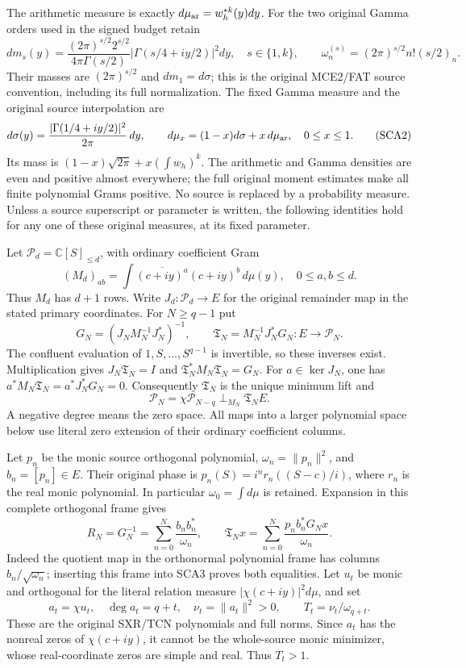 The arithmetic measure is exactly $d\mu_{\rm ar}=w_h^{*k}(y)dy$.
For the two original Gamma orders used in the signed budget retain
\[
 dm_s(y)=\frac{(2\pi)^{s/2}2^{s/2}}{4\pi\Gamma(s/2)}
           |\Gamma(s/4+iy/2)|^2dy,\quad s\in\{1,k\},\qquad
 \omega_n^{(s)}=(2\pi)^{s/2}n!(s/2)_n.
\]
Their masses are $(2\pi)^{s/2}$ and $dm_1=d\sigma$; this is the
original MCE2/FAT source convention, including its full normalization.
The fixed Gamma measure and the original source interpolation are
\[
 d\sigma(y)=\frac{|\Gamma(1/4+iy/2)|^2}{2\pi}\,dy,
 \qquad d\mu_x=(1-x)d\sigma+x\,d\mu_{\rm ar},\quad0\le x\le1.
 \tag{SCA2}
\]
Its mass is $(1-x)\sqrt{2\pi}+x(\int w_h)^k$.
The arithmetic and Gamma densities are even and positive almost everywhere;
the full original moment estimates make all finite polynomial Grams positive.
No source is replaced by a probability measure. Unless a source superscript
or parameter is written, the following identities hold for any one of
these original measures, at its fixed parameter.

Let $\mathcal P_d=\mathbb C[S]_{\le d}$, with ordinary coefficient Gram
\[
 (M_d)_{ab}=\int\overline{(c+iy)^a}(c+iy)^b\,d\mu(y),
 \quad0\le a,b\le d.
\]
Thus $M_d$ has $d+1$ rows. Write $J_d:\mathcal P_d\to E$ for the original
remainder map in the stated primary coordinates. For $N\ge q-1$ put
\[
 G_N=(J_NM_N^{-1}J_N^*)^{-1},\qquad
 \mathfrak T_N=M_N^{-1}J_N^*G_N:E\longrightarrow\mathcal P_N.
 \tag{SCA3}
\]
The confluent evaluation of $1,S,\ldots,S^{q-1}$ is invertible, so these
inverses exist. Multiplication gives $J_N\mathfrak T_N=I$ and
$\mathfrak T_N^*M_N\mathfrak T_N=G_N$. For
$a\in\ker J_N$, one has $a^*M_N\mathfrak T_N=a^*J_N^*G_N=0$.
Consequently $\mathfrak T_N$ is the unique minimum lift and
\[
 \mathcal P_N=\chi\mathcal P_{N-q}\mathbin{\perp_{M_N}}
                      \mathfrak T_NE.
 \tag{SCA4}
\]
A negative degree means the zero space. All maps into a larger polynomial
space below use literal zero extension of their ordinary coefficient columns.

Let $p_n$ be the monic source orthogonal polynomial, $\omega_n=\|p_n\|^2$,
and $b_n=[p_n]\in E$. Their original phase is
$p_n(S)=i^nr_n((S-c)/i)$, where $r_n$ is the real monic polynomial.
In particular $\omega_0=\int d\mu$ is retained. Expansion in this complete
orthogonal frame gives
\[
 R_N=G_N^{-1}=\sum_{n=0}^N\frac{b_nb_n^*}{\omega_n},\qquad
 \mathfrak T_Nx=\sum_{n=0}^N
               \frac{p_n b_n^*G_Nx}{\omega_n}.
 \tag{SCA5}
\]
Indeed the quotient map in the orthonormal polynomial frame has columns
$b_n/\sqrt{\omega_n}$; inserting this frame into SCA3 proves both equalities.
Let $u_t$ be monic and orthogonal for the literal relation measure
$|\chi(c+iy)|^2d\mu$, and set
\[
 a_t=\chi u_t,\quad\deg a_t=q+t,\quad
 \nu_t=\|a_t\|^2>0,\qquad T_t=\nu_t/\omega_{q+t}.
 \tag{SCA6}
\]
These are the original SXR/TCN polynomials and full norms. Since $a_t$ has
the nonreal zeros of $\chi(c+iy)$, it cannot be the whole-source monic
minimizer, whose real-coordinate zeros are simple and real. Thus $T_t>1$.

